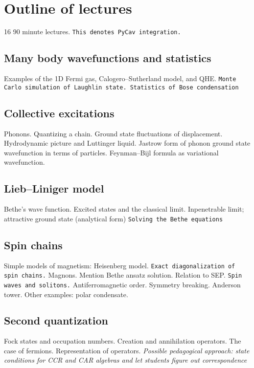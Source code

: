 \section{Outline of lectures}

16 90 minute lectures. \verb|This denotes PyCav integration.|

\subsection{Many body wavefunctions and statistics}

Examples of the 1D Fermi gas, Calogero--Sutherland model, and QHE. \verb|Monte Carlo simulation of Laughlin state. Statistics of Bose condensation|

\subsection{Collective excitations}

Phonons. Quantizing a chain. Ground state fluctuations of displacement. Hydrodynamic picture and Luttinger liquid. Jastrow form of phonon ground state wavefunction in terms of particles. Feynman–Bijl formula as variational wavefunction.

\subsection{Lieb--Liniger model}

Bethe's wave function. Excited states and the classical limit. Inpenetrable limit; attractive ground state (analytical form) \verb|Solving the Bethe equations|


\subsection{Spin chains}

Simple models of magnetism: Heisenberg model. \verb|Exact diagonalization of spin chains.| Magnons. Mention Bethe ansatz solution. Relation to SEP. \verb|Spin waves and solitons.|
Antiferromagnetic order. Symmetry breaking. Anderson tower. Other examples: polar condensate.

\subsection{Second quantization}

Fock states and occupation numbers. Creation and annihilation operators. The case of fermions. Representation of operators. \textit{Possible pedagogical approach: state conditions for CCR and CAR algebras and let students figure out correspondence}

